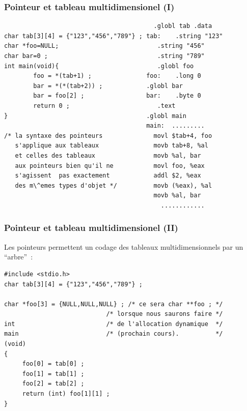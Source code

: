 \begin{frame}[fragile]
  \frametitle{Pointeur et tableau multidimensionel (I)}%

\begin{verbatim}
                                         .globl tab .data            
char tab[3][4] = {"123","456","789"} ; tab:    .string "123"       
char *foo=NULL;                           .string "456"       
char bar=0 ;                              .string "789"       
int main(void){                           .globl foo                  
        foo = *(tab+1) ;               foo:    .long 0           
        bar = *(*(tab+2)) ;            .globl bar                  
        bar = foo[2] ;                 bar:    .byte 0           
        return 0 ;                        .text               
}                                      .globl main                 
                                       main:  .........
/* la syntaxe des pointeurs              movl $tab+4, foo 
   s'applique aux tableaux               movb tab+8, %al  
   et celles des tableaux                movb %al, bar    
   aux pointeurs bien qu'il ne           movl foo, %eax   
   s'agissent  pas exactement            addl $2, %eax    
   des m\^emes types d'objet */          movb (%eax), %al 
                                         movb %al, bar    
                                           ............
\end{verbatim}
\end{frame}
\begin{frame}[fragile]
  \frametitle{Pointeur et tableau multidimensionel (II)}%
  Les pointeurs permettent un codage des tableaux multidimensionnels
  par un ``arbre''~:
\begin{verbatim}
#include <stdio.h>
char tab[3][4] = {"123","456","789"} ;

char *foo[3] = {NULL,NULL,NULL} ; /* ce sera char **foo ; */
                            /* lorsque nous saurons faire */          
int                         /* de l'allocation dynamique  */
main                        /* (prochain cours).          */      
(void)
{ 
     foo[0] = tab[0] ;     
     foo[1] = tab[1] ;     
     foo[2] = tab[2] ;                
     return (int) foo[1][1] ;                    
}                                       
\end{verbatim}
\end{frame}
